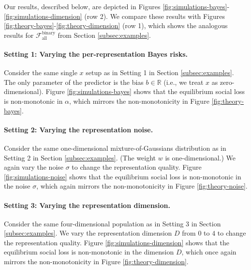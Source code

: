 \documentclass[letterpaper,11pt]{article}
\theoremstyle{plain}
\begin{document}
Our results, described below, are depicted in Figures \ref{fig:simulations-bayes}-\ref{fig:simulations-dimension} (row 2). We compare these results with Figures \ref{fig:theory-bayes}-\ref{fig:theory-dimension} (row 1), which shows the analogous results for $\mathcal{F}^{\text{binary}}_{\text{all}}$ from Section \ref{subsec:examples}. 

\paragraph{Setting 1: Varying the per-representation Bayes risks.} Consider the same single $x$ setup as in Setting 1 in Section \ref{subsec:examples}. The only parameter of the predictor is the bias $b \in \mathbb{R}$ (i.e., we treat $x$ as zero-dimensional). %
Figure \ref{fig:simulations-bayes} shows that the equilibrium social loss is non-monotonic in $\alpha$, which mirrors the non-monotonicity in Figure \ref{fig:theory-bayes}.

\paragraph{Setting 2: Varying the representation noise.} 
Consider the same one-dimensional mixture-of-Gaussians distribution as in Setting 2 in Section \ref{subsec:examples}. (The weight $w$ is one-dimensional.) We again vary the noise $\sigma$ to change the representation quality. 
Figure \ref{fig:simulations-noise} shows that the equilibrium social loss is non-monotonic in the noise $\sigma$, which again mirrors the non-monotonicity in  Figure \ref{fig:theory-noise}. 

\paragraph{Setting 3: Varying the representation dimension.} Consider the same four-dimensional population as in Setting 3 in Section \ref{subsec:examples}. We vary the representation dimension $D$ from $0$ to $4$ to change the representation quality. Figure \ref{fig:simulations-dimension} shows that the equilibrium social loss is non-monotonic in the dimension $D$, which once again mirrors the non-monotonicity in  Figure \ref{fig:theory-dimension}. 
\end{document}
